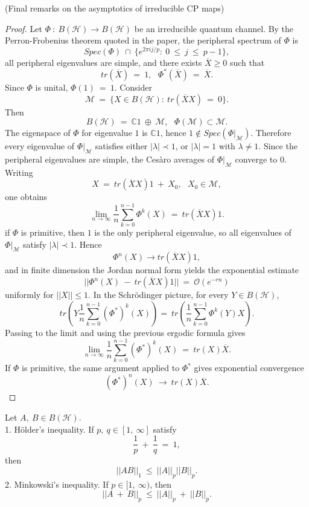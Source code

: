 \documentclass[11pt,a4paper]{article}
\begin{document}
    \begin{proposition}
    (Final remarks on the asymptotics of irreducible CP maps)
    \end{proposition}
    \begin{proof}
    Let $\Phi\ :\ B(\mathcal{H})\rightarrow B(\mathcal{H})$ be an irreducible quantum channel. By the Perron-Frobenius theorem quoted in the paper, the peripheral spectrum of $\Phi$ is $$Spec(\Phi)\ \cap\ \{e^{2\pi ij/p}:\ 0\ \leq\ j\ \leq\ p-1\},$$ all peripheral eigenvalues are simple, and there exists $\overline{X}\geq 0$ such that $$tr(\overline{X})\ =\ 1,\ \ \ \Phi^*(\overline{X})\ =\ \overline{X}.$$ Since $\Phi$ is unital, $\Phi(1)\ =\ 1$. Consider $$\mathcal{M}\ =\ \{ X \in B(\mathcal{H}):\ tr(\overline{X}X)\ =\ 0\}.$$ Then $$B(\mathcal{H})\ =\ \mathbb{C}1\ \oplus\ \mathcal{M},\ \ \ \Phi(\mathcal{M})\subset \mathcal{M}.$$ The eigenspace of $\Phi$ for eigenvalue $1$ is $\mathbb{C}1$, hence $1 \notin Spec(\Phi|_\mathcal{M})$. Therefore every eigenvalue of $\Phi|_\mathcal{M}$ satisfies either $|\lambda|\prec 1$, or $|\lambda| = 1$ with $\lambda \neq 1$. Since the peripheral eigenvalues are simple, the Cesàro averages of $\Phi|_\mathcal{M}$ converge to $0$. Writing $$X\ =\ tr(\overline{X}X)1\ +\ X_0, \ \ \ X_0 \in \mathcal{M},$$ one obtains $$\lim_{n\rightarrow \infty}\frac{1}{n}\sum_{k=0}^{n-1}\Phi^k(X)\ =\ tr(\overline{X}X)1.$$ if $\Phi$ is primitive, then $1$ is the only peripheral eigenvalue, so all eigenvalues of $\Phi|_\mathcal{M}$ satisfy $|\lambda|\prec 1$. Hence $$\Phi^n(X)\rightarrow tr(\overline{X}X)1,$$ and in finite dimension the Jordan normal form yields the exponential estimate $$||\Phi^n(X)\ -\ tr(\overline{X}X)1||\ =\ \mathcal{O}(e^{-rn})$$ uniformly for $||X||\leq 1$. In the Schr\"odinger picture, for every $Y \in B(\mathcal{H}),$ $$tr
    \left( Y\frac{1}{n}\sum_{k=0}^{n-1}(\Phi^*)^k(X)\right) =\ tr\left(\frac{1}{n}\sum_{k=0}^{n-1}\Phi^k(Y)X\right).$$ Passing to the limit and using the previous ergodic formula gives $$\lim_{n\rightarrow \infty}\frac{1}{n}\sum_{k=0}^{n-1}(\Phi^*)^k(X)\ =\ tr(X)\overline{X}.$$ If $\Phi$ is primitive, the same argument applied to $\Phi^*$ gives exponential convergence $$(\Phi^*)^n(X)\ \rightarrow\ tr(X)\overline{X}.$$
    \end{proof}
    \vspace{0.3cm} %
    \pagebreak
    \begin{proposition}
    Let $A,\ B \in B(\mathcal{H})$.\\
    1. H\"older's inequality. If $p,\ q \in [1,\ \infty]$ satisfy $$\frac{1}{p}\ +\ \frac{1}{q}\ =\ 1,$$ then $$||AB||_1\ \leq\ ||A||_p||B||_p.$$ 
    2. Minkowski's inequality. If $p \in [1,\ \infty)$, then $$||A\ +\ B||_p\ \leq\ ||A||_p\ +\ ||B||_p.$$
    \end{proposition}
\end{document}
